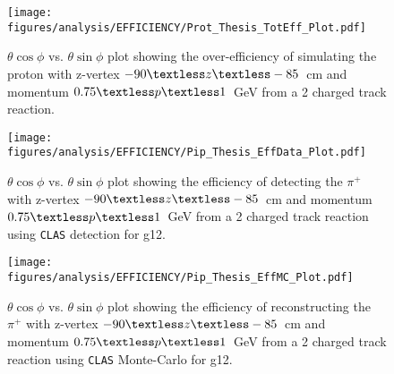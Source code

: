 \documentclass[11pt,a4paper]{article}
\newcommand{\abbr}[1]{\textsc{\texttt{#1}}}
\def\figures{/Users/michaelkunkel/WORK/GIT_HUB/THESIS/figures/print}
\newlength{\figwidth}
\newlength{\hfigheight}
\begin{document}
					\begin{figure}[h!]\begin{center}
							\texttt{[image: \\figures/analysis/EFFICIENCY/Prot\_Thesis\_TotEff\_Plot.pdf]}
							\caption[$\theta \cos\phi$ vs. $\theta \sin\phi$ plot showing the over-efficiency of simulating the proton with z-vertex $-90\textless z\textless-85$~cm and momentum $0.75\textless p \textless 1$~GeV from a 2 charged track reaction]{\label{fig:toteff_prot} $\theta \cos\phi$ vs. $\theta \sin\phi$ plot showing the over-efficiency of simulating the proton with z-vertex $-90\textless z\textless-85$~cm and momentum $0.75\textless p \textless 1$~GeV from a 2 charged track reaction.}
						\end{center}\end{figure}
						\begin{figure}[h!]\begin{center}
								\texttt{[image: \\figures/analysis/EFFICIENCY/Pip\_Thesis\_EffData\_Plot.pdf]}
								\caption[$\theta \cos\phi$ vs. $\theta \sin\phi$ plot showing the efficiency of detecting the $\pi^+$ with z-vertex $-90\textless z\textless-85$~cm and momentum $0.75\textless p \textless 1$~GeV from a 2 charged track reaction using \abbr{CLAS} detection for g12]{\label{fig:eff_pip_data} $\theta \cos\phi$ vs. $\theta \sin\phi$ plot showing the efficiency of detecting the $\pi^+$ with z-vertex $-90\textless z\textless-85$~cm and momentum $0.75\textless p \textless 1$~GeV from a 2 charged track reaction using \abbr{CLAS} detection for g12.}
							\end{center}\end{figure}
							\begin{figure}[h!]\begin{center}
									\texttt{[image: \\figures/analysis/EFFICIENCY/Pip\_Thesis\_EffMC\_Plot.pdf]}
									\caption[$\theta \cos\phi$ vs. $\theta \sin\phi$ plot showing the efficiency of reconstructing the $\pi^+$ with z-vertex $-90\textless z\textless-85$~cm and momentum $0.75\textless p \textless 1$~GeV from a 2 charged track reaction using \abbr{CLAS} Monte-Carlo for g12]{\label{fig:eff_pip_MC} $\theta \cos\phi$ vs. $\theta \sin\phi$ plot showing the efficiency of reconstructing the $\pi^+$ with z-vertex $-90\textless z\textless-85$~cm and momentum $0.75\textless p \textless 1$~GeV from a 2 charged track reaction using \abbr{CLAS} Monte-Carlo for g12.}
								\end{center}\end{figure}
\end{document}
